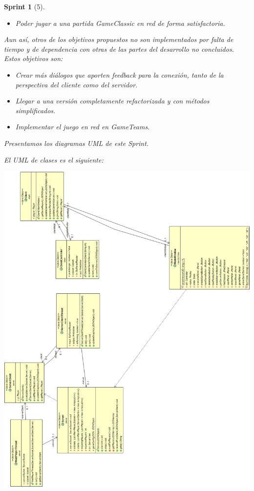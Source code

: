 \documentclass[12pt,a4paper,openright]{book}
\theoremstyle{break}
\newtheorem*{sprint}{Sprint}
\begin{document}
\begin{sprint}[5]
\begin{itemize}
\item Poder jugar a una partida GameClassic en red de forma satisfactoria.

\end{itemize}

Aun así, otros de los objetivos propuestos no son implementados por falta de tiempo y de dependencia con otras de las partes del desarrollo no concluidos. Estos objetivos son:

\begin{itemize}
\item Crear más diálogos que aporten feedback para la conexión, tanto de la perspectiva del cliente como del servidor.

\item Llegar a una versión completamente refactorizada y con métodos simplificados.

\item Implementar el juego en red en GameTeams.
\end{itemize}

Presentamos los diagramas UML de este Sprint.

El UML de clases es el siguiente:

\begin{center}
\includegraphics[scale=0.45]{UMLClasesRedSprint5.png} 
\end{center}


\end{sprint}
\end{document}
